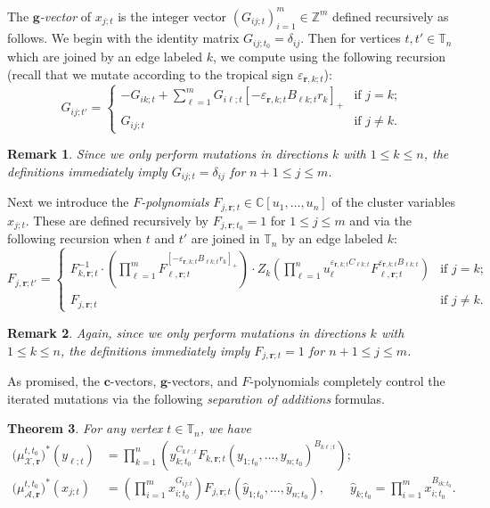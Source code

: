 \documentclass{amsart}
\newtheorem{theorem}{Theorem}[section]
\newtheorem{remark}[theorem]{Remark}
\numberwithin{equation}{section}
\newcommand{\bfc}{\mathbf{c}}
\newcommand{\bfg}{\mathbf{g}}
\newcommand{\bfr}{{\boldsymbol{r}}}
\newcommand{\cA}{\mathcal{A}}
\newcommand{\cX}{\mathcal{X}}
\newcommand{\CC}{\mathbb{C}}
\newcommand{\TT}{\mathbb{T}}
\newcommand{\ZZ}{\mathbb{Z}}
\begin{document}
The \emph{$\bfg$-vector} of $x_{j;t}$ is the integer vector $(G_{ij;t})_{i=1}^m\in\ZZ^m$ defined recursively as follows.
We begin with the identity matrix $G_{ij;t_0}=\delta_{ij}$.
Then for vertices $t,t'\in\TT_n$ which are joined by an edge labeled $k$, we compute using the following recursion (recall that we mutate according to the tropical sign $\varepsilon_{\bfr,k;t}$):
\begin{equation}
  \label{eq:g-matrix mutation}
  G_{ij;t'}=
  \begin{cases}
    -G_{ik;t}+\sum\limits_{\ell=1}^m G_{i\ell;t}[-\varepsilon_{\bfr,k;t} B_{\ell k;t} r_k]_+ & \text{if $j=k$;}\\
    G_{ij;t} & \text{if $j\ne k$.}
  \end{cases}
\end{equation}
\begin{remark}
  Since we only perform mutations in directions $k$ with $1\le k\le n$, the definitions immediately imply $G_{ij;t}=\delta_{ij}$ for $n+1\le j\le m$.
\end{remark}
Next we introduce the \emph{$F$-polynomials} $F_{j,\bfr;t}\in\CC[u_1,\ldots,u_n]$ of the cluster variables $x_{j;t}$.
These are defined recursively by $F_{j,\bfr;t_0}=1$ for $1\le j\le m$ and via the following recursion when $t$ and $t'$ are joined in $\TT_n$ by an edge labeled $k$:
\begin{equation}
  \label{eq:F-polynomial mutation}
  F_{j,\bfr;t'}=
  \begin{cases}
    F_{k,\bfr;t}^{-1}\cdot \left(\prod_{\ell=1}^m F_{\ell,\bfr;t}^{[-\varepsilon_{\bfr,k;t} B_{\ell k;t} r_k]_+}\right) \cdot Z_k\left(\prod_{\ell=1}^n u_\ell^{\varepsilon_{\bfr,k;t} C_{\ell k;t}} F_{\ell,\bfr;t}^{\varepsilon_{\bfr,k;t} B_{\ell k;t}}\right) & \text{if $j=k$;}\\
    F_{j,\bfr;t} & \text{if $j\ne k$.}
  \end{cases}
\end{equation}
\begin{remark}
  Again, since we only perform mutations in directions $k$ with $1\le k\le n$, the definitions immediately imply $F_{j,\bfr;t}=1$ for $n+1\le j\le m$.
\end{remark}
As promised, the $\bfc$-vectors, $\bfg$-vectors, and $F$-polynomials completely control the iterated mutations via the following \emph{separation of additions} formulas.
\begin{theorem}
  \label{th:separation}
  \cite{FZ07,Nak15,NR16}
  For any vertex $t\in\TT_n$, we have
  \begin{align}
    \label{eq:separation of additions 1}
    \big(\mu_{\cX,\bfr}^{t,t_0}\big)^*(y_{\ell;t})&=\prod_{k=1}^n \left( y_{k;t_0}^{C_{k\ell;t}} F_{k,\bfr;t}(y_{1;t_0},\ldots,y_{n;t_0})^{B_{k\ell;t}} \right);\\
    \label{eq:separation of additions 2}
    \big(\mu_{\cA,\bfr}^{t,t_0}\big)^*(x_{j;t})&=\left(\prod_{i=1}^m x_{i;t_0}^{G_{ij;t}}\right) F_{j,\bfr;t}(\hat y_{1;t_0},\ldots,\hat y_{n;t_0}),\qquad \hat y_{k;t_0}=\prod_{i=1}^m x_{i;t_0}^{B_{ik;t_0}}.
  \end{align}
\end{theorem}
\end{document}
